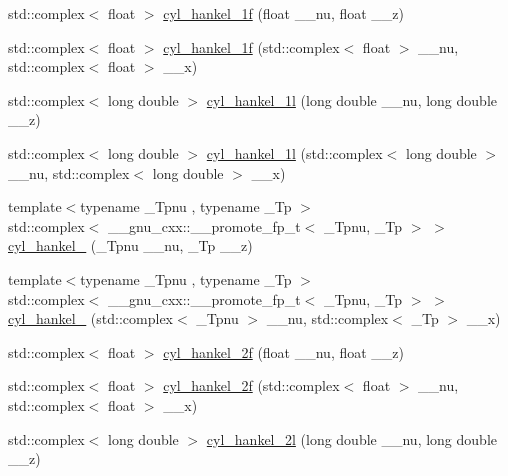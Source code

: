 \begin{DoxyCompactItemize}
std\+::complex$<$ float $>$ \hyperlink{group__gnu__math__spec__func_ga89758ed03e56567baa62b90cc4784f71}{cyl\+\_\+hankel\+\_\+1f} (float \+\_\+\+\_\+nu, float \+\_\+\+\_\+z)
\item 
std\+::complex$<$ float $>$ \hyperlink{group__gnu__math__spec__func_ga810e021a3f11c1b2253c15c6f4d41143}{cyl\+\_\+hankel\+\_\+1f} (std\+::complex$<$ float $>$ \+\_\+\+\_\+nu, std\+::complex$<$ float $>$ \+\_\+\+\_\+x)
\item 
std\+::complex$<$ long double $>$ \hyperlink{group__gnu__math__spec__func_gacb49c66b4267fbc56906db02f14365f2}{cyl\+\_\+hankel\+\_\+1l} (long double \+\_\+\+\_\+nu, long double \+\_\+\+\_\+z)
\item 
std\+::complex$<$ long double $>$ \hyperlink{group__gnu__math__spec__func_ga6900f79ec70673bcb001538aec74e07c}{cyl\+\_\+hankel\+\_\+1l} (std\+::complex$<$ long double $>$ \+\_\+\+\_\+nu, std\+::complex$<$ long double $>$ \+\_\+\+\_\+x)
\item 
{\footnotesize template$<$typename \+\_\+\+Tpnu , typename \+\_\+\+Tp $>$ }\\std\+::complex$<$ \+\_\+\+\_\+gnu\+\_\+cxx\+::\+\_\+\+\_\+promote\+\_\+fp\+\_\+t$<$ \+\_\+\+Tpnu, \+\_\+\+Tp $>$ $>$ \hyperlink{group__gnu__math__spec__func_ga6c1d2d390e547ded9e0f4cc46395d90c}{cyl\+\_\+hankel\+\_} (\+\_\+\+Tpnu \+\_\+\+\_\+nu, \+\_\+\+Tp \+\_\+\+\_\+z)
\item 
{\footnotesize template$<$typename \+\_\+\+Tpnu , typename \+\_\+\+Tp $>$ }\\std\+::complex$<$ \+\_\+\+\_\+gnu\+\_\+cxx\+::\+\_\+\+\_\+promote\+\_\+fp\+\_\+t$<$ \+\_\+\+Tpnu, \+\_\+\+Tp $>$ $>$ \hyperlink{group__gnu__math__spec__func_ga378002c9d6cb4f64683bdb128da1df47}{cyl\+\_\+hankel\+\_} (std\+::complex$<$ \+\_\+\+Tpnu $>$ \+\_\+\+\_\+nu, std\+::complex$<$ \+\_\+\+Tp $>$ \+\_\+\+\_\+x)
\item 
std\+::complex$<$ float $>$ \hyperlink{group__gnu__math__spec__func_ga2b75361870975c47d57bed71b4064ce7}{cyl\+\_\+hankel\+\_\+2f} (float \+\_\+\+\_\+nu, float \+\_\+\+\_\+z)
\item 
std\+::complex$<$ float $>$ \hyperlink{group__gnu__math__spec__func_gae21f9d09b937eaf9729982da5a382f20}{cyl\+\_\+hankel\+\_\+2f} (std\+::complex$<$ float $>$ \+\_\+\+\_\+nu, std\+::complex$<$ float $>$ \+\_\+\+\_\+x)
\item 
std\+::complex$<$ long double $>$ \hyperlink{group__gnu__math__spec__func_ga4babb91ca6906f237e8bd1f0f1a10509}{cyl\+\_\+hankel\+\_\+2l} (long double \+\_\+\+\_\+nu, long double \+\_\+\+\_\+z)
\item 

\end{DoxyCompactItemize}
